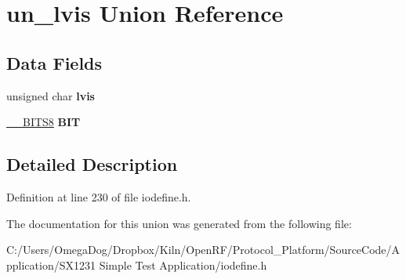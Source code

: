 \hypertarget{unionun__lvis}{\section{un\-\_\-lvis Union Reference}
\label{unionun__lvis}
}
\subsection*{Data Fields}
\begin{DoxyCompactItemize}
\item 
\hypertarget{unionun__lvis_a6de88d88c0343fecb4538472f1e63f80}{unsigned char {\bfseries lvis}}\label{unionun__lvis_a6de88d88c0343fecb4538472f1e63f80}

\item 
\hypertarget{unionun__lvis_af77333f7d32095ab3ebf7fb60e04691d}{\hyperlink{struct_____b_i_t_s8}{\-\_\-\-\_\-\-B\-I\-T\-S8} {\bfseries B\-I\-T}}\label{unionun__lvis_af77333f7d32095ab3ebf7fb60e04691d}

\end{DoxyCompactItemize}


\subsection{Detailed Description}


Definition at line 230 of file iodefine.\-h.



The documentation for this union was generated from the following file\-:\begin{DoxyCompactItemize}
\item 
C\-:/\-Users/\-Omega\-Dog/\-Dropbox/\-Kiln/\-Open\-R\-F/\-Protocol\-\_\-\-Platform/\-Source\-Code/\-Application/\-S\-X1231 Simple Test Application/iodefine.\-h\end{DoxyCompactItemize}
